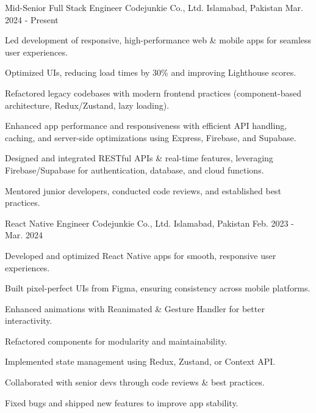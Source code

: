 

\begin{cventries}

  \cventry
    {Mid-Senior Full Stack Engineer } %
    {Codejunkie Co., Ltd.} %
    {Islamabad, Pakistan} %
    {Mar. 2024 - Present}%
    {
      \begin{cvitems} %
        \item {Led development of responsive, high-performance web \& mobile apps for seamless user experiences.}
        \item {Optimized UIs, reducing load times by 30\% and improving Lighthouse scores.}
        \item {Refactored legacy codebases with modern frontend practices (component-based architecture, Redux/Zustand, lazy loading).}
        \item {Enhanced app performance and responsiveness with efficient API handling, caching, and server-side optimizations using Express, Firebase, and Supabase.}
        \item {Designed and integrated RESTful APIs \& real-time features, leveraging Firebase/Supabase for authentication, database, and cloud functions.}
        \item {Mentored junior developers, conducted code reviews, and established best practices.}
      \end{cvitems}
    }

  \cventry
    {React Native Engineer } %
    {Codejunkie Co., Ltd.} %
    {Islamabad, Pakistan} %
    {Feb. 2023 - Mar. 2024}%
    {
      \begin{cvitems} %
        \item {Developed and optimized React Native apps for smooth, responsive user experiences.}
        \item {Built pixel-perfect UIs from Figma, ensuring consistency across mobile platforms.}
        \item {Enhanced animations with Reanimated \& Gesture Handler for better interactivity.}
        \item {Refactored components for modularity and maintainability.}
        \item {Implemented state management using Redux, Zustand, or Context API.}
        \item {Collaborated with senior devs through code reviews \& best practices.}
        \item {Fixed bugs and shipped new features to improve app stability.}
      \end{cvitems}
    }


\end{cventries}
